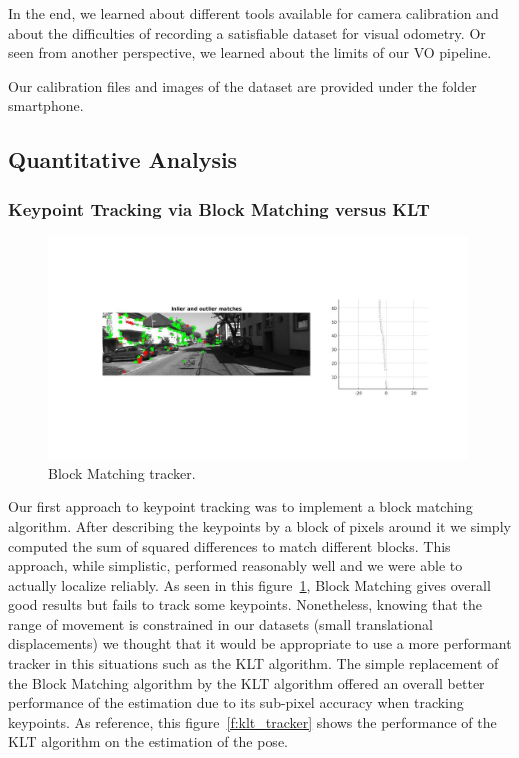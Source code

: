 In the end, we learned about different tools available for camera calibration and about the difficulties of recording a satisfiable dataset
for visual odometry. Or seen from another perspective, we learned about the limits of our VO pipeline.

Our calibration files and images of the dataset are provided under the folder smartphone.








\subsection{Quantitative Analysis}
\subsubsection{Keypoint Tracking via Block Matching versus KLT}

\begin{figure}
  \includegraphics[width=0.99\textwidth]{files/block_tracker.jpg}
  \caption[\label{f:block_tracker} Block Matching tracker]{Block Matching tracker.}
\end{figure}

Our first approach to keypoint tracking was to implement a block matching algorithm. After describing the keypoints by a block of pixels around it
we simply computed the sum of squared differences to match different blocks. This approach, while simplistic, performed reasonably well and we
were able to actually localize reliably. As seen in this figure~\ref{f:block_tracker}, Block Matching gives overall good results but fails to
track some keypoints.
Nonetheless, knowing that the range of movement is constrained in our datasets (small translational displacements) we thought that it would be appropriate to use a more performant tracker in this situations such as the KLT algorithm.
The simple replacement of the Block Matching algorithm by the KLT algorithm offered an overall better performance of the estimation due to its sub-pixel accuracy when tracking keypoints. As reference, this figure~\ref{f:klt_tracker} shows the performance of the KLT algorithm on the estimation of the pose.

